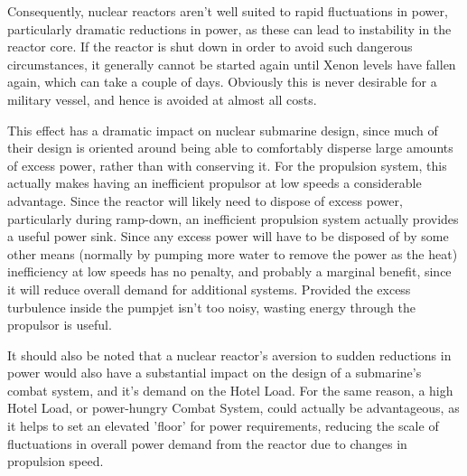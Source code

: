 \documentclass{article}\usepackage[]{graphicx}\usepackage[]{color}
\begin{document}
Consequently, nuclear reactors aren't well suited to rapid fluctuations in power, particularly dramatic reductions in power, as these can lead to instability in the reactor core.  If the reactor is shut down in order to avoid such dangerous circumstances, it generally cannot be started again until Xenon levels have fallen again, which can take a couple of days.  Obviously this is never desirable for a military vessel, and hence is avoided at almost all costs. 

 
This effect has a dramatic impact on nuclear submarine design, since much of their design is oriented around being able to comfortably disperse large amounts of excess power, rather than with conserving it.  For the propulsion system, this actually makes having an inefficient propulsor at low speeds a considerable advantage.  Since the reactor will likely need to dispose of excess power, particularly during ramp-down, an inefficient propulsion system actually provides a useful power sink.  Since any excess power will have to be disposed of by some other means (normally by pumping more water to remove the power as the heat) inefficiency at low speeds has no penalty, and probably a marginal benefit, since it will reduce overall demand for additional systems.    Provided the excess turbulence inside the pumpjet isn't too noisy, wasting energy through the propulsor is useful. 


It should also be noted that a nuclear reactor's aversion to sudden reductions in power would also have a substantial impact on the design of a submarine's combat system, and it's demand on the Hotel Load. For the same reason, a high Hotel Load, or power-hungry Combat System, could actually be advantageous, as it helps to set an elevated 'floor' for power requirements, reducing the scale of fluctuations in overall power demand from the reactor due to changes in propulsion speed.  


\printbibliography
 
\end{document}
